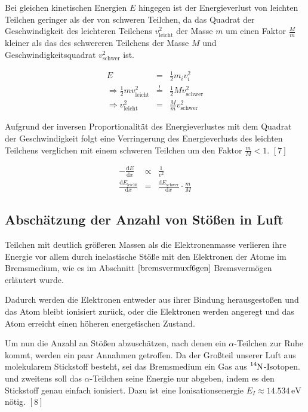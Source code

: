 \documentclass[12pt,a4paper]{scrartcl}
\numberwithin{equation}{section} %
\renewcommand{\[}{} %
\renewcommand{\]}{\noindent} %
\begin{document}
Bei gleichen kinetischen Energien \(E\) hingegen ist der Energieverlust
von leichten Teilchen geringer als der von schweren Teilchen, da das
Quadrat der Geschwindigkeit des leichteren Teilchens
\(v_\mathrm{leicht}^2\) der Masse \(m\) um einen Faktor \(\frac{M}{m}\)
kleiner als das des schwereren Teilchens der Masse \(M\) und
Geschwindigkeitsquadrat \(v_\mathrm{schwer}^2\) ist.

\[
\begin{eqnarray}
    E &=& \frac{1}{2}m_i v_i^2 \\
    \Rightarrow \frac{1}{2} m v_\mathrm{leicht}^2
        &\overset{!}{=}& \frac{1}{2} M v_\mathrm{schwer}^2 \\
    \Rightarrow v_\mathrm{leicht}^2 & = &\frac{M}{m} v_\mathrm{schwer}^2
\end{eqnarray}
\]

Aufgrund der inversen Proportionalität des Energieverlustes mit dem
Quadrat der Geschwindigkeit folgt eine Verringerung des Energieverlusts
des leichten Teilchens verglichen mit einem schweren Teilchen um den
Faktor \(\frac{m}{M} < 1\). \([7]\)

\[
\begin{eqnarray}
    - \frac{\mathrm dE}{\mathrm dx} &\propto& \frac{1}{v^2} \\
    \frac{\mathrm dE_\mathrm{leicht}}{\mathrm dx}
        &=& \frac{\mathrm dE_\mathrm{schwer}}{\mathrm dx}
            \cdot \frac{m}{M}
\end{eqnarray}
\]

\hypertarget{abschuxe4tzung-der-anzahl-von-stuxf6uxdfen-in-luft}{%
\subsection{Abschätzung der Anzahl von Stößen in
Luft}\label{abschuxe4tzung-der-anzahl-von-stuxf6uxdfen-in-luft}}

Teilchen mit deutlich größeren Massen als die Elektronenmasse verlieren
ihre Energie vor allem durch inelastische Stöße mit den Elektronen der
Atome im Bremsmedium, wie es im Abschnitt \(\ref{bremsvermuxf6gen}\)
Bremsvermögen erläutert wurde.

Dadurch werden die Elektronen entweder aus ihrer Bindung herausgestoßen
und das Atom bleibt ionisiert zurück, oder die Elektronen werden
angeregt und das Atom erreicht einen höheren energetischen Zustand.

Um nun die Anzahl an Stößen abzuschätzen, nach denen ein
\(\alpha\)-Teilchen zur Ruhe kommt, werden ein paar Annahmen getroffen.
Da der Großteil unserer Luft aus molekularem Stickstoff besteht, sei das
Bremsmedium ein Gas aus \(\ce{^{14}N}\)-Isotopen. und zweitens soll das
\(\alpha\)-Teilchen seine Energie nur abgeben, indem es den Stickstoff
genau einfach ionisiert. Dazu ist eine Ionisationsenergie $E_I\approx 14.534 \mathrm{\,eV}$ nötig. $[8]$
\end{document}
